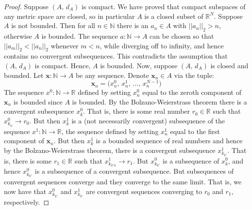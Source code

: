 \documentclass{article}
\theoremstyle{plain}
\begin{document}
        \begin{proof}
            Suppose $(A,\,d_{A})$ is compact. We have proved that compact
            subspaces of any metric space are closed, so in particular
            $A$ is a closed subset of $\mathbb{R}^{N}$. Suppose $A$ is not
            bounded. Then for all $n\in\mathbb{N}$ there is an
            $a_{n}\in{A}$ with $||a_{n}||_{2}>n$, otherwise
            $A$ is bounded. The sequence $a:\mathbb{N}\rightarrow{A}$ can be
            chosen so that $||a_{m}||_{2}<||a_{n}||_{2}$ whenever $m<n$, while
            diverging off to infinity, and hence contains no
            convergent subsequences. This contradicts the assumption that
            $(A,\,d_{A})$ is compact. Hence, $A$ is bounded. Now, suppose
            $(A,\,d_{A})$ is closed and bounded. Let
            $\mathbf{x}:\mathbb{N}\rightarrow{A}$ be any sequence. Denote
            $\mathbf{x}_{n}\in{A}$ via the tuple:
            \begin{equation}
                \mathbf{x}_{n}=\big(x_{n}^{0},\,x_{n}^{1},\,\dots,\,
                    x_{n}^{N-1}\big)
            \end{equation}
            The sequence $x^{0}:\mathbb{N}\rightarrow\mathbb{R}$ defined by
            setting $x_{n}^{0}$ equal to the zeroth component of
            $\mathbf{x}_{n}$ is bounded since $A$ is bounded. By
            the Bolzano-Weierstrass theorem there is a
            convergent subsequence $x_{k}^{0}$. That is, there is some
            real number $r_{0}\in\mathbb{R}$ such that
            $x_{k_{n}}^{0}\rightarrow{r}_{0}$. But then
            $x_{k}^{1}$ is a (not necessarily convergent) subsequence of the
            sequence $x^{1}:\mathbb{N}\rightarrow\mathbb{R}$, the sequence
            defined by setting $x_{n}^{1}$ equal to the first component of
            $\mathbf{x}_{n}$. But then $x_{k}^{1}$ is a bounded sequence of
            real numbers and hence by the Bolzano-Weierstrass theorem, there
            is a convergent subsequence $x_{k_{k'}}^{1}$. That is, there is
            some $r_{1}\in\mathbb{R}$ such that
            $x_{k_{k'n}}^{1}\rightarrow{r}_{1}$. But
            $x_{k_{k'}}^{0}$ is a subsequence of $x_{k}^{0}$, and hence
            $x_{k_{k'}}^{0}$ is a subsequence of a convergent subsequence.
            But subsequences of convergent sequences converge and they converge
            to the same limit. That is, we now have that
            $x_{k_{k'}}^{0}$ and $x_{k_{k'}}^{1}$ are convergent sequences
            converging to $r_{0}$ and $r_{1}$, respectively.

\end{proof}
\end{document}
